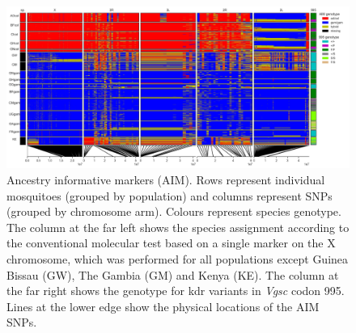 \documentclass[a4paper,11pt,abstracton,hidelinks]{scrartcl}
\begin{document}
\begin{figure}[H]
	\begin{center}
		\includegraphics*[width=6.3in]{artwork/AIM_figure_scaled.jpg}
	\end{center}
	\caption{Ancestry informative markers (AIM). Rows represent individual mosquitoes (grouped by population) and columns represent SNPs (grouped by chromosome arm). Colours represent species genotype. The column at the far left shows the species assignment according to the conventional molecular test based on a single marker on the X chromosome, which was performed for all populations except Guinea Bissau (GW), The Gambia (GM) and Kenya (KE). The column at the far right shows the genotype for kdr variants in \textit{Vgsc} codon 995. Lines at the lower edge show the physical locations of the AIM SNPs.}
	\label{aim}
\end{figure}
\clearpage
\end{document}
